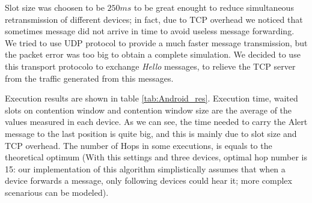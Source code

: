 Slot size was choosen to be $250ms$ to be great enought to reduce simultaneous retransmission of different devices; in fact, due to TCP overhead we noticed that sometimes message did not arrive in time to avoid useless message forwarding. We tried to use UDP protocol to provide a much faster message transmission, but the packet error was too big to obtain a complete simulation. We decided to use this transport protocolo to exchange \textit{Hello} messages, to relieve the TCP server from the traffic generated from this messages.

Execution results are shown in table \ref{tab:Android_res}. Execution time, waited slots on contention window and contention window size are the average of the values measured in each device. As we can see, the time needed to carry the Alert message to the last position is quite big, and this is mainly due to slot size and TCP overhead. The number of Hops in some executions, is equals to the theoretical optimum (With this settings and three devices, optimal hop number is 15: our implementation of this algorithm simplistically assumes that when a device forwards a message, only following devices could hear it; more complex scenarious can be modeled).

